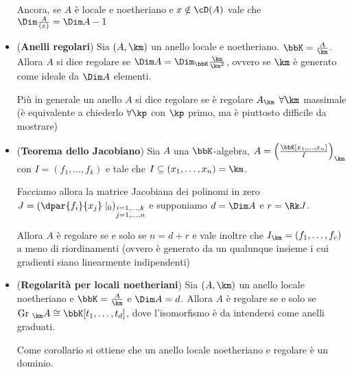 \documentclass[a4paper,NoNotes,GeneralMath]{stdmdoc}
\newcommand{\lbr}[1]{\ensuremath{{\left( {#1} \right)}}}
\newcommand{\Gr}{\text{Gr }}
\begin{document}
\begin{itemize}
  Ancora, se $A$ è locale e noetheriano e $x \notin \cD (A)$ vale che
  $\Dim \frac{A}{(x)} = \Dim A - 1$
\item ({\bf Anelli regolari}) Sia $(A, \km)$ un anello locale e
  noetheriano. $\bbK = \frac{A}{\km}$. Allora $A$ si dice regolare se
  $\Dim A = \Dim_\bbK \frac{\km}{\km^2}$, ovvero se $\km$ è generato
  come ideale da $\Dim A$ elementi.

  Più in generale un anello $A$ si dice regolare se è regolare $A_\km$
  $\forall \km$ massimale (è equivalente a chiederlo $\forall \kp$ con
  $\kp$ primo, ma è piuttosto difficile da mostrare)
\item ({\bf Teorema dello Jacobiano}) Sia $A$ una $\bbK$-algebra, $A =
  \lbr{\frac{\bbK[x_1, \ldots, x_n]}{I}}_\km$ con $I = (f_1, \ldots,
  f_k)$ e tale che $I \subseteq (x_1, \ldots, x_n) = \km$.

  Facciamo allora la matrice Jacobiana dei polinomi in zero
  $J = \lbr{\dpar{f_i}{x_j}\mid_0}_{\substack{i = 1, \ldots, k \\ j = 1,
    \ldots, n}}$ e supponiamo $d = \Dim A$ e $r = \Rk J$.

  Allora $A$ è regolare se e solo se $n = d + r$ e vale inoltre che
  $I_\km = (f_1, \ldots, f_r)$ a meno di riordinamenti (ovvero è
  generato da un qualunque insieme i cui gradienti siano linearmente
  indipendenti)
\item ({\bf Regolarità per locali noetheriani}) Sia $(A, \km)$ un anello
  locale noetheriano e $\bbK = \frac{A}{\km}$ e $\Dim A = d$. Allora $A$
  è regolare se e solo se $\Gr_\km A \cong \bbK[t_1, \ldots, t_d]$, dove
  l'isomorfismo è da intendersi come anelli graduati.

  Come corollario si ottiene che un anello locale noetheriano e regolare
  è un dominio.
\end{itemize}
\end{document}

